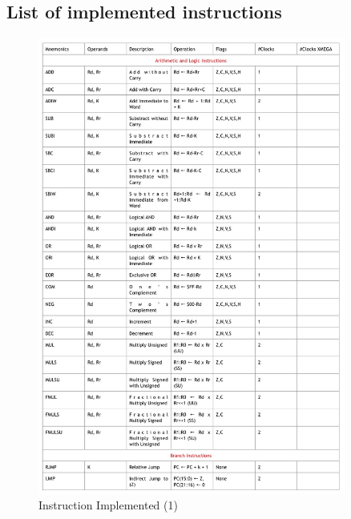 \documentclass[12pt,a4paper]{report}
\begin{document}
\subsection{List of implemented instructions}
\begin{figure}[h]
  \centering
  \includegraphics[width=0.9\textwidth]{IT1}
  \caption{Instruction Implemented (1)}
  \label{fig:it1}
\end{figure}
\end{document}
